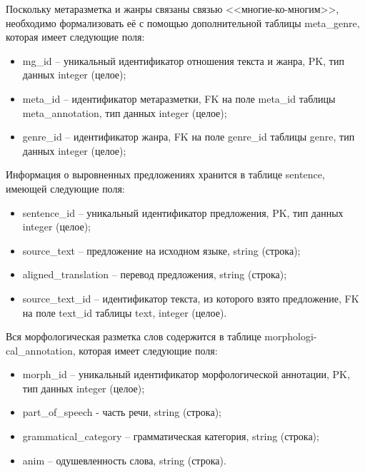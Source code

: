 Поскольку метаразметка и жанры связаны связью <<многие-ко-многим>>, необходимо формализовать её с помощью дополнительной таблицы meta\_genre, которая имеет следующие поля:

\begin{itemize}[label=---]
	\item mg\_id -- уникальный идентификатор отношения текста и жанра, PK, тип данных integer (целое);
	
	\item meta\_id -- идентификатор метаразметки, FK на поле meta\_id таблицы \\meta\_annotation, тип данных integer (целое);
	
	\item genre\_id -- идентификатор жанра, FK на поле genre\_id таблицы genre, тип данных integer (целое);
\end{itemize}

Информация о выровненных предложениях хранится в таблице sentence, имеющей следующие поля:

\begin{itemize}[label=---]
	\item sentence\_id -- уникальный идентификатор предложения, PK, тип данных integer (целое);
	
	\item source\_text -- предложение на исходном языке, string (строка);
	
	\item aligned\_translation -- перевод предложения, string (строка);
	
	\item source\_text\_id -- идентификатор текста, из которого взято предложение, FK на поле text\_id таблицы text, integer (целое).
\end{itemize}

Вся морфологическая разметка слов содержится в таблице morphologi-cal\_annotation, которая имеет следующие поля:

\begin{itemize}[label=---]
	\item morph\_id -- уникальный идентификатор морфологической аннотации, PK, тип данных integer (целое);
	
	\item part\_of\_speech - часть речи, string (строка);
	
	\item grammatical\_category -- грамматическая категория, string (строка);
	
	\item anim -- одушевленность слова, string (строка).
\end{itemize}

